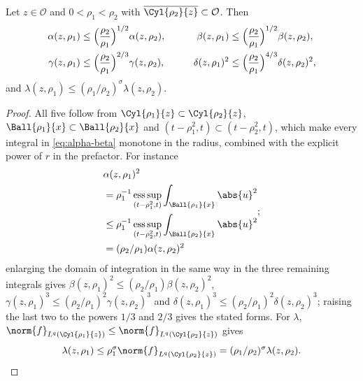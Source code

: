 \documentclass[11pt,reqno]{amsart}
\begin{document}
\begin{lemma}\label{lem:monotonicity}
Let $z\in\mathcal{O}$ and $0<\rho_{1}<\rho_{2}$ with
$\overline{\Cyl{\rho_{2}}{z}}\subset\mathcal{O}$. Then
\begin{equation}\label{eq:monotonicity}
\begin{aligned}
  \alpha(z,\rho_{1})&\le\Bigl(\frac{\rho_{2}}{\rho_{1}}\Bigr)^{1/2}\alpha(z,\rho_{2}),
  &\qquad
  \beta(z,\rho_{1})&\le\Bigl(\frac{\rho_{2}}{\rho_{1}}\Bigr)^{1/2}\beta(z,\rho_{2}),\\
  \gamma(z,\rho_{1})&\le\Bigl(\frac{\rho_{2}}{\rho_{1}}\Bigr)^{2/3}\gamma(z,\rho_{2}),
  &\qquad
  \delta(z,\rho_{1})^{2}&\le\Bigl(\frac{\rho_{2}}{\rho_{1}}\Bigr)^{4/3}\delta(z,\rho_{2})^{2},
\end{aligned}
\end{equation}
and $\lambda(z,\rho_{1})\le(\rho_{1}/\rho_{2})^{\sigma}\lambda(z,\rho_{2})$.
\end{lemma}

\begin{proof}
All five follow from $\Cyl{\rho_{1}}{z}\subset\Cyl{\rho_{2}}{z}$,
$\Ball{\rho_{1}}{x}\subset\Ball{\rho_{2}}{x}$ and
$(t-\rho_{1}^{2},t)\subset(t-\rho_{2}^{2},t)$, which make every integral in
\eqref{eq:alpha-beta} monotone in the radius, combined with the explicit power of
$r$ in the prefactor. For instance
\[
\begin{aligned}
&\alpha(z,\rho_{1})^{2}
\\ &=\rho_{1}^{-1}\operatorname*{ess\,sup}_{(t-\rho_{1}^{2},t)}\int_{\Ball{\rho_{1}}{x}}\abs{u}^{2}
\\ &\le\rho_{1}^{-1}\operatorname*{ess\,sup}_{(t-\rho_{2}^{2},t)}\int_{\Ball{\rho_{2}}{x}}\abs{u}^{2}
\\ &=(\rho_{2}/\rho_{1})\alpha(z,\rho_{2})^{2}
\end{aligned}
;
\] enlarging the domain of
integration in the same way in the three remaining integrals gives
$\beta(z,\rho_{1})^{2}\le(\rho_{2}/\rho_{1})\beta(z,\rho_{2})^{2}$,
$\gamma(z,\rho_{1})^{3}\le(\rho_{2}/\rho_{1})^{2}\gamma(z,\rho_{2})^{3}$ and
$\delta(z,\rho_{1})^{3}\le(\rho_{2}/\rho_{1})^{2}\delta(z,\rho_{2})^{3}$;
raising the last two to the powers $1/3$ and $2/3$ gives the stated forms. For
$\lambda$, $\norm{f}_{L^{q}(\Cyl{\rho_{1}}{z})}\le\norm{f}_{L^{q}(\Cyl{\rho_{2}}{z})}$
gives
\[
\lambda(z,\rho_{1})\le\rho_{1}^{\sigma}\norm{f}_{L^{q}(\Cyl{\rho_{2}}{z})}
=(\rho_{1}/\rho_{2})^{\sigma}\lambda(z,\rho_{2})
.
\]
\end{proof}
\end{document}
